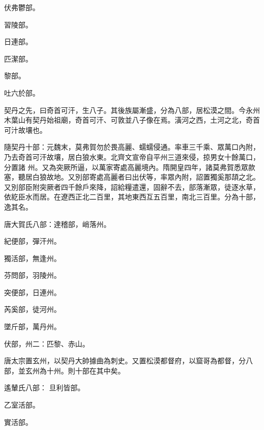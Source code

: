 \begin{pinyinscope}
 伏弗鬱部。



 習陵部。



 日連部。



 匹潔部。



 黎部。



 吐六於部。



 契丹之先，曰奇首可汗，生八子。其後族屬漸盛，分為八部，居松漠之間。今永州木葉山有契丹始祖廟，奇首可汗、可敦並八子像在焉。潢河之西，土河之北，奇首可汁故壤也。



 隨契丹十部：元魏末，莫弗賀勿於畏高麗、蠕蠕侵通。率車三千乘、眾萬口內附，乃去奇首可汗故壤，居白狼水東。北齊文宣帝自平州三道來侵，掠男女十餘萬口，分置諸
 州。又為突厥所逼，以萬家寄處高麗境內。隋開皇四年，諸莫弗賀悉眾款塞，聽居白狼故地。又別部寄處高麗者曰出伏等，率眾內附，詔置獨奚那頡之北。又別部臣附突厥者四千餘戶來降，詔給糧遣還，固辭不去，部落漸眾，徒逐水草，依紇臣水而居。在遼西正北二百里，其地東西互五百里，南北三百里。分為十部，逸其名。



 唐大賀氏八部：達稽部，峭落州。



 紀便部，彈汗州。



 獨活部，無逢州。



 芬問部，羽陵州。



 突便部，日連州。



 芮奚部，徒河州。



 墜斤部，萬丹州。



 伏部，州二：匹黎、赤山。



 唐太宗置玄州，以契丹大帥據曲為刺史。又置松漠都督府，以窟哥為都督，分八部，並玄州為十州。則十部在其中矣。



 遙輦氏八部：
 旦利皆部。



 乙室活部。



 實活部。




\end{pinyinscope}

